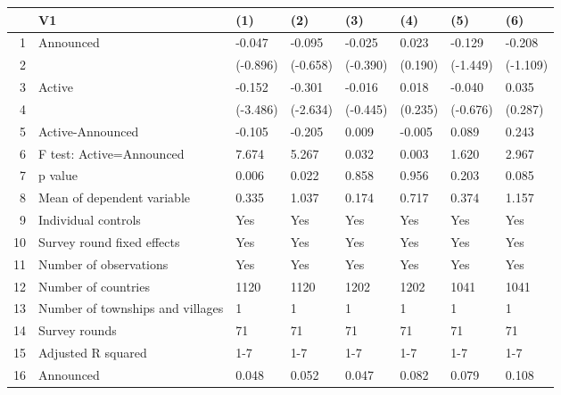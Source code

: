 \begin{table}[ht]
\centering
\begin{tabular}{rlllllll}
  \hline
 & V1 & (1) & (2) & (3) & (4) & (5) & (6) \\ 
  \hline
1 & Announced & -0.047 & -0.095 & -0.025 & 0.023 & -0.129 & -0.208 \\ 
  2 &  & (-0.896) & (-0.658) & (-0.390) & (0.190) & (-1.449) & (-1.109) \\ 
  3 & Active & -0.152 & -0.301 & -0.016 & 0.018 & -0.040 & 0.035 \\ 
  4 &  & (-3.486) & (-2.634) & (-0.445) & (0.235) & (-0.676) & (0.287) \\ 
  5 & Active-Announced & -0.105 & -0.205 & 0.009 & -0.005 & 0.089 & 0.243 \\ 
  6 & F test: Active=Announced & 7.674 & 5.267 & 0.032 & 0.003 & 1.620 & 2.967 \\ 
  7 & p value & 0.006 & 0.022 & 0.858 & 0.956 & 0.203 & 0.085 \\ 
  8 & Mean of dependent variable & 0.335 & 1.037 & 0.174 & 0.717 & 0.374 & 1.157 \\ 
  9 & Individual controls & Yes & Yes & Yes & Yes & Yes & Yes \\ 
  10 & Survey round fixed effects & Yes & Yes & Yes & Yes & Yes & Yes \\ 
  11 & Number of observations & Yes & Yes & Yes & Yes & Yes & Yes \\ 
  12 & Number of countries & 1120 & 1120 & 1202 & 1202 & 1041 & 1041 \\ 
  13 & Number of townships and villages & 1 & 1 & 1 & 1 & 1 & 1 \\ 
  14 & Survey rounds & 71 & 71 & 71 & 71 & 71 & 71 \\ 
  15 & Adjusted R squared & 1-7 & 1-7 & 1-7 & 1-7 & 1-7 & 1-7 \\ 
  16 & Announced & 0.048 & 0.052 & 0.047 & 0.082 & 0.079 & 0.108 \\ 
   \hline
\end{tabular}
\end{table}
